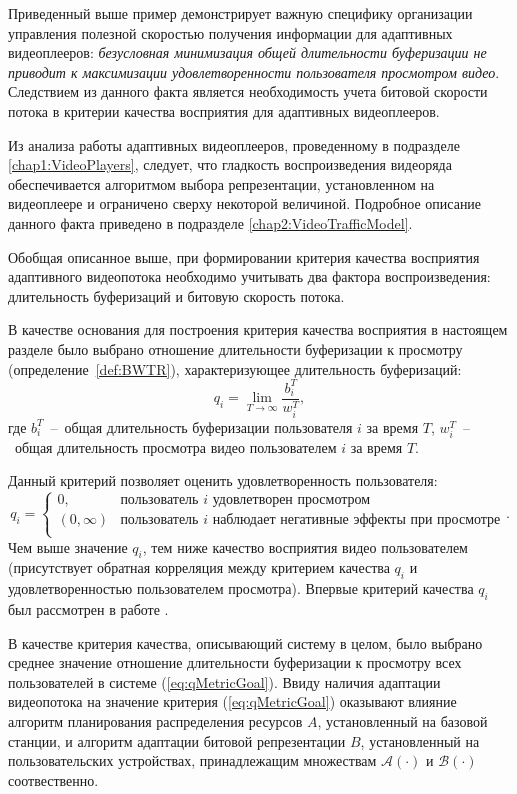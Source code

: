 Приведенный выше пример демонстрирует важную специфику организации управления полезной скоростью получения информации для адаптивных видеоплееров: \textit{безусловная минимизация общей длительности буферизации не приводит к максимизации удовлетворенности пользователя просмотром видео}. Следствием из данного факта является необходимость учета битовой скорости потока в критерии качества восприятия для адаптивных видеоплееров.

Из анализа работы адаптивных видеоплееров, проведенному в подразделе \ref{chap1:VideoPlayers}, следует, что гладкость воспроизведения видеоряда обеспечивается алгоритмом выбора репрезентации, установленном на видеоплеере и ограничено сверху некоторой величиной. Подробное описание данного факта приведено в подразделе \ref{chap2:VideoTrafficModel}.

Обобщая описанное выше, при формировании критерия качества восприятия адаптивного видеопотока необходимо учитывать два фактора воспроизведения: длительность буферизаций и битовую скорость потока.

В качестве основания для построения критерия качества восприятия в настоящем разделе было выбрано отношение длительности буферизации к просмотру (определение~\ref{def:BWTR}), характеризующее длительность буферизаций: $$q_i = \lim\limits_{T\rightarrow\infty} \frac{b_i^T}{w_i^T},$$
где $b_i^T$~--~общая длительность буферизации пользователя $i$ за время $T$, $w_i^T$~--~общая длительность просмотра видео пользователем $i$ за время $T$.

Данный критерий позволяет оценить удовлетворенность пользователя:
$$q_i=
\begin{cases}
0, & \text{пользователь $i$ удовлетворен просмотром}\\
(0, \infty) & \text{пользователь $i$ наблюдает негативные эффекты при просмотре}\\
\end{cases}.
$$
Чем выше значение $q_i$, тем ниже качество восприятия видео пользователем (присутствует обратная корреляция между критерием качества $q_i$ и удовлетворенностью пользователем просмотра). Впервые критерий качества $q_i$ был рассмотрен в работе \cite{Bakin_Globecom}.

В качестве критерия качества, описывающий систему в целом, было выбрано среднее значение отношение длительности буферизации к просмотру всех пользователей в системе (\ref{eq:qMetricGoal}). Ввиду наличия адаптации видеопотока на значение критерия (\ref{eq:qMetricGoal}) оказывают влияние алгоритм планирования распределения ресурсов $A$, установленный на базовой станции, и алгоритм адаптации битовой репрезентации $B$, установленный на пользовательских устройствах, принадлежащим множествам $\mathcal{A}(\cdot)$ и $\mathcal{B}(\cdot)$ соотвественно.

